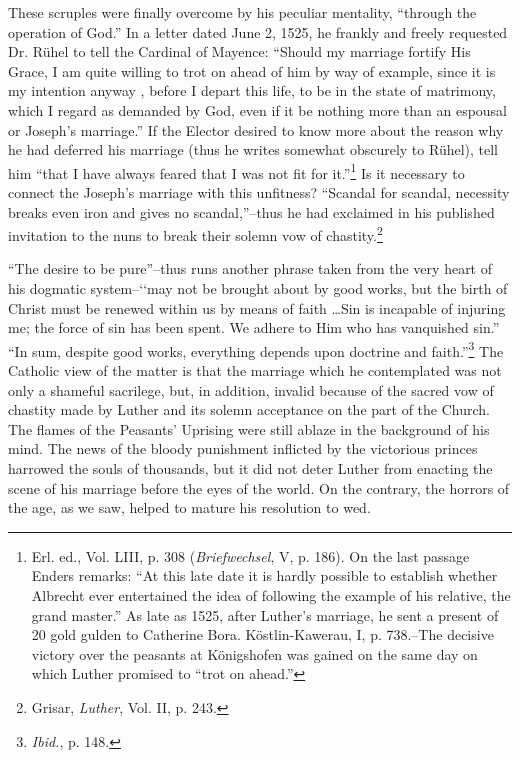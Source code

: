 These scruples were finally overcome by his peculiar mentality,
“through the operation of God.” In a letter dated June 2, 1525, he
frankly and freely requested Dr. Rühel to tell the Cardinal of Mayence:
“Should my marriage fortify His Grace, I am quite willing to
trot on ahead of him by way of example, since it is my intention anyway
, before I depart this life, to be in the state of matrimony, which
I regard as demanded by God, even if it be nothing more than an
espousal or Joseph’s marriage.” If the Elector desired to know more
about the reason why he had deferred his marriage (thus he writes
somewhat obscurely to Rühel), tell him “that I have always feared
that I was not fit for it.”\footnote
{Erl. ed., Vol. LIII, p. 308 (\textit{Briefwechsel}, V, p. 186). On the last passage Enders remarks:
``At this late date it is hardly possible to establish whether Albrecht ever entertained
the idea of following the example of his relative, the grand master.'' As late as
1525, after Luther's marriage, he sent a present of 20 gold gulden to Catherine Bora.
Köstlin-Kawerau, I, p. 738.--The decisive victory over the peasants at Königshofen was
gained on the same day on which Luther promised to ``trot on ahead.''}
Is it necessary to connect the Joseph’s
marriage with this unfitness? “Scandal for scandal, necessity breaks
even iron and gives no scandal,”--thus he had exclaimed in his published
invitation to the nuns to break their solemn vow of chastity.\footnote
{Grisar, \textit{Luther}, Vol. II, p. 243. }

“The desire to be pure”--thus runs another phrase taken from the
very heart of his dogmatic system--`‘may not be brought about by
good works, but the birth of Christ must be renewed within us by
means of faith \dots Sin is incapable of injuring me; the force of
sin has been spent. We adhere to Him who has vanquished sin.” “In
sum, despite good works, everything depends upon doctrine and
faith.”\footnote{\textit{Ibid.}, p. 148. }
The Catholic view of the matter is that the marriage which
he contemplated was not only a shameful sacrilege, but, in addition,
invalid because of the sacred vow of chastity made by Luther and
its solemn acceptance on the part of the Church.
The flames of the Peasants’ Uprising were still ablaze in the background
of his mind. The news of the bloody punishment inflicted by
the victorious princes harrowed the souls of thousands, but it did
not deter Luther from enacting the scene of his marriage before the
eyes of the world. On the contrary, the horrors of the age, as we saw,
helped to mature his resolution to wed.

